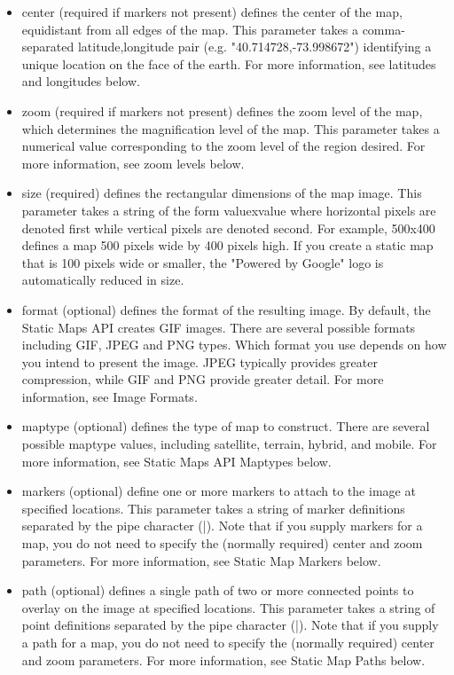 \documentclass{article}
\begin{document}
\begin{itemize}
    \item center (required if markers not present) defines the center of the map, equidistant from all edges of the map. This parameter takes a comma-separated {latitude,longitude} pair (e.g. "40.714728,-73.998672") identifying a unique location on the face of the earth. For more information, see latitudes and longitudes below.
    \item zoom (required if markers not present) defines the zoom level of the map, which determines the magnification level of the map. This parameter takes a numerical value corresponding to the zoom level of the region desired. For more information, see zoom levels below.
    \item size (required) defines the rectangular dimensions of the map image. This parameter takes a string of the form valuexvalue where horizontal pixels are denoted first while vertical pixels are denoted second. For example, 500x400 defines a map 500 pixels wide by 400 pixels high. If you create a static map that is 100 pixels wide or smaller, the "Powered by Google" logo is automatically reduced in size.
    \item format (optional) defines the format of the resulting image. By default, the Static Maps API creates GIF images. There are several possible formats including GIF, JPEG and PNG types. Which format you use depends on how you intend to present the image. JPEG typically provides greater compression, while GIF and PNG provide greater detail. For more information, see Image Formats.
    \item maptype (optional) defines the type of map to construct. There are several possible maptype values, including satellite, terrain, hybrid, and mobile. For more information, see Static Maps API Maptypes below.
    \item markers (optional) define one or more markers to attach to the image at specified locations. This parameter takes a string of marker definitions separated by the pipe character (|). Note that if you supply markers for a map, you do not need to specify the (normally required) center and zoom parameters. For more information, see Static Map Markers below.
    \item path (optional) defines a single path of two or more connected points to overlay on the image at specified locations. This parameter takes a string of point definitions separated by the pipe character (|). Note that if you supply a path for a map, you do not need to specify the (normally required) center and zoom parameters. For more information, see Static Map Paths below.

\end{itemize}
\end{document}
